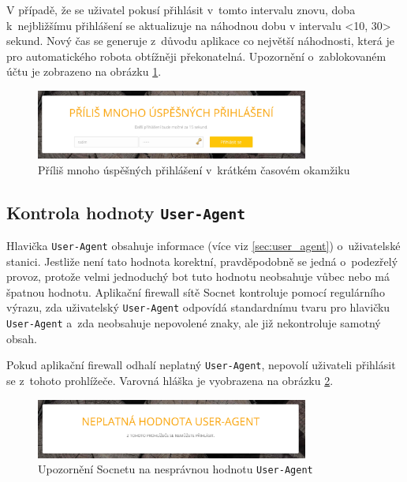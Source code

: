V případě, že se uživatel pokusí přihlásit v~tomto intervalu znovu, doba k~nejbližšímu přihlášení se aktualizuje na náhodnou dobu v intervalu <10, 30> sekund. Nový čas se generuje z~důvodu aplikace co největší náhodnosti, která je pro automatického robota obtížněji překonatelná. Upozornění o~zablokovaném účtu je zobrazeno na obrázku \ref{img:too_many_logins}.

\begin{figure}[H]
	\centering
	\includegraphics[width=0.8\textwidth]{images/too_many_logins.jpg}
	\caption{Příliš mnoho úspěšných přihlášení v~krátkém časovém okamžiku}
	\label{img:too_many_logins}
\end{figure}

\subsection*{Kontrola hodnoty \texttt{User-Agent}}
\label{sec:check_UA}
Hlavička \texttt{User-Agent} obsahuje informace (více viz \ref{sec:user_agent}) o~uživatelské stanici. Jestliže není tato hodnota korektní, pravděpodobně se jedná o~podezřelý provoz, protože velmi jednoduchý bot tuto hodnotu neobsahuje vůbec nebo má špatnou hodnotu. Aplikační firewall sítě Socnet kontroluje pomocí regulárního výrazu, zda uživatelský \texttt{User-Agent} odpovídá standardnímu tvaru pro hlavičku \texttt{User-Agent} a~zda neobsahuje nepovolené znaky, ale již nekontroluje samotný obsah.

Pokud aplikační firewall odhalí neplatný \texttt{User-Agent}, nepovolí uživateli přihlásit se z~tohoto prohlížeče. Varovná hláška je vyobrazena na obrázku \ref{img:bad_user_agent}.

\begin{figure}[H]
	\centering
	\includegraphics[width=0.8\textwidth]{images/bad_user_agent.jpg}
	\caption{Upozornění Socnetu na nesprávnou hodnotu \texttt{User-Agent}}
	\label{img:bad_user_agent}
\end{figure}

